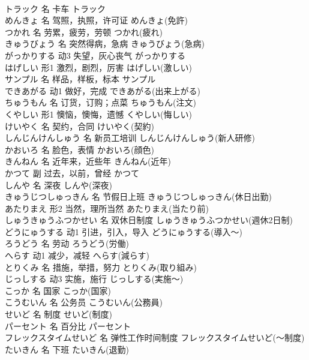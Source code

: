 \documentclass[8pt]{extreport}
\begin{document}
\begin{CJK}{UTF8}{min}
\\	トラック	名	卡车	トラック	
\\	めんきょ	名	驾照，执照，许可证	めんきょ(免許)	
\\	つかれ	名	劳累，疲劳，劳顿	つかれ(疲れ)	
\\	きゅうびょう	名	突然得病，急病	きゅうびょう(急病)	
\\	がっかりする	动3	失望，灰心丧气	がっかりする	
\\	はげしい	形1	激烈，剧烈，厉害	はげしい(激しい)	
\\	サンプル	名	样品，样板，标本	サンプル	
\\	できあがる	动1	做好，完成	できあがる(出来上がる)	
\\	ちゅうもん	名	订货，订购；点菜	ちゅうもん(注文)	
\\	くやしい	形1	懊恼，懊悔，遗憾	くやしい(悔しい)	
\\	けいやく	名	契约，合同	けいやく(契約)	
\\	しんじんけんしゅう	名	新员工培训	しんじんけんしゅう(新人研修)	
\\	かおいろ	名	脸色，表情	かおいろ(顔色)	
\\	きんねん	名	近年来，近些年	きんねん(近年)	
\\	かつて	副	过去，以前，曾经	かつて	
\\	しんや	名	深夜	しんや(深夜)	
\\	きゅうじつしゅっきん	名	节假日上班	きゅうじつしゅっきん(休日出勤)	
\\	あたりまえ	形2	当然，理所当然	あたりまえ(当たり前)	
\\	しゅうきゅうふつかせい	名	双休日制度	しゅうきゅうふつかせい(週休2日制)	
\\	どうにゅうする	动1	引进，引入，导入	どうにゅうする(導入～)	
\\	ろうどう	名	劳动	ろうどう(労働)	
\\	へらす	动1	减少，减轻	へらす(減らす)	
\\	とりくみ	名	措施，举措，努力	とりくみ(取り組み)	
\\	じっしする	动3	实施，施行	じっしする(実施～)	
\\	こっか	名	国家	こっか(国家)	
\\	こうむいん	名	公务员	こうむいん(公務員)	
\\	せいど	名	制度	せいど(制度)	
\\	パーセント	名	百分比	パーセント
\\	フレックスタイムせいど	名	弹性工作时间制度	フレックスタイムせいど(～制度)	
\\	たいきん	名	下班	たいきん(退勤)	

\end{CJK}
\end{document}
